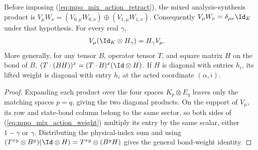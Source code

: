 \begin{lemma}
    \label{thm:mpo_mixed_action_weight}
    \leanok
    Before imposing (\ref{eq:mpo_mix_action_retract}), the mixed
    analysis-synthesis product is
    $V_\mu W_\nu=(V_{0,\mu}W_{0,\nu})\oplus
        (V_{1,\mu}W_{1,\nu})$. Consequently
    $V_\mu W_\nu=\delta_{\mu\nu}\Id_E$ under that hypothesis.
    For every real $\gamma$,
    \begin{align}
        V_\mu(\Id_K\otimes H_\gamma) & =H_\gamma V_\mu.
        \label{eq:mpo_mix_action_weight}
    \end{align}
    More generally, for any tensor $B$, operator tensor $T$, and
    square matrix $H$ on the bond of $B$,
    $(T\cdot(BH))^x=(T\cdot B)^x(\Id\otimes H)$.
    If $H$ is diagonal with entries $h_i$, its lifted weight is diagonal
    with entry $h_i$ at the acted coordinate $(\alpha,i)$.
\end{lemma}
\begin{proof}
    \leanok
    Expanding each product over the four spaces $K_p\otimes E_q$ leaves
    only the matching spaces $p=q$, giving the two diagonal
    products. On the support of $V_\mu$, its row and state-bond column
    belong to the same sector, so both sides of
    (\ref{eq:mpo_mix_action_weight}) multiply its entry by the same
    scalar, either $1-\gamma$ or $\gamma$. Distributing the
    physical-index sum and using
    $(T^{xy}\otimes B^y)(\Id\otimes H)=T^{xy}\otimes(B^yH)$ gives the
    general bond-weight identity.
\end{proof}

